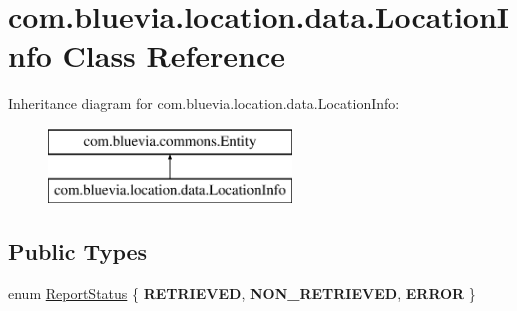 \hypertarget{classcom_1_1bluevia_1_1location_1_1data_1_1LocationInfo}{
\section{com.bluevia.location.data.LocationInfo Class Reference}
\label{classcom_1_1bluevia_1_1location_1_1data_1_1LocationInfo}
}
Inheritance diagram for com.bluevia.location.data.LocationInfo:\begin{figure}[H]
\begin{center}
\leavevmode
\includegraphics[height=2.000000cm]{classcom_1_1bluevia_1_1location_1_1data_1_1LocationInfo}
\end{center}
\end{figure}
\subsection*{Public Types}
\begin{DoxyCompactItemize}
\item 
enum \hyperlink{classcom_1_1bluevia_1_1location_1_1data_1_1LocationInfo_aab9819d3c89265c055e64b69da1bab9e}{ReportStatus} \{ {\bfseries RETRIEVED}, 
{\bfseries NON\_\-RETRIEVED}, 
{\bfseries ERROR}
 \}
\end{DoxyCompactItemize}
